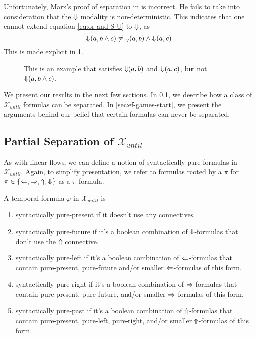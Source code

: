 \documentclass[a4paper,UKenglish,cleveref, autoref, thm-restate, numberwithinsect]{lipics-v2021}
\def\Larrow{\ensuremath\mathord{\Leftarrow}}
\def\Rarrow{\ensuremath\mathord{\Rightarrow}}
\def\Uarrow{\ensuremath\mathord{\Uparrow}}
\def\Darrow{\ensuremath\mathord{\Downarrow}}
\begin{document}
Unfortunately, Marx's proof of separation in \cite{xpathComplete} is incorrect. He fails to take into consideration that the $\Darrow$ modality is non-deterministic. This indicates that one cannot extend equation \eqref{eq:or-and-S-U} to $\Darrow$, as
\begin{equation*}
    \Darrow(a, b \land c) \not\equiv \Darrow(a, b) \land \Darrow(a, c)
\end{equation*}
This is made explicit in \cref{fig:darrow-a-b-and-c}.
\begin{figure}[h]
    \centering
    \caption[]{This is an example that satisfies $\Darrow(a, b)$ and $\Darrow(a, c)$, but not $\Darrow(a, b \land c)$.}
    \label{fig:darrow-a-b-and-c}
\end{figure}

We present our results in the next few sections. In \cref{sec:partial-separation-start}, we describe how a class of $\mathcal{X}_{until}$ formulas can be separated. In \cref{sec:ef-games-start}, we present the arguments behind our belief that certain formulas can never be separated. %

\subsection{Partial Separation of $\mathcal{X}_{until}$}
\label{sec:partial-separation-start}

As with linear flows, we can define a notion of syntactically pure formulas in $\mathcal{X}_{until}$. Again, to simplify presentation, we refer to formulas rooted by a $\pi$ for $\pi \in \{\Larrow, \Rarrow, \Uarrow, \Darrow\}$ as a $\pi$-formula.
\begin{definition}
    A temporal formula $\varphi$ in $\mathcal{X}_{until}$ is
    \begin{enumerate}
        \item syntactically pure-present if it doesn't use any connectives.
        \item syntactically pure-future if it's a boolean combination of $\Darrow$-formulas that don't use the $\Uarrow$ connective.
        \item syntactically pure-left if it's a boolean combination of $\Larrow$-formulas that contain pure-present, pure-future and/or smaller $\Larrow$-formulas of this form.
        \item syntactically pure-right if it's a boolean combination of $\Rarrow$-formulas that contain pure-present, pure-future, and/or smaller $\Rarrow$-formulas of this form.
        \item syntactically pure-past if it's a boolean combination of $\Uarrow$-formulas that contain pure-present, pure-left, pure-right, and/or smaller $\Uarrow$-formulas of this form.
    \end{enumerate}
\end{definition}
\end{document}
